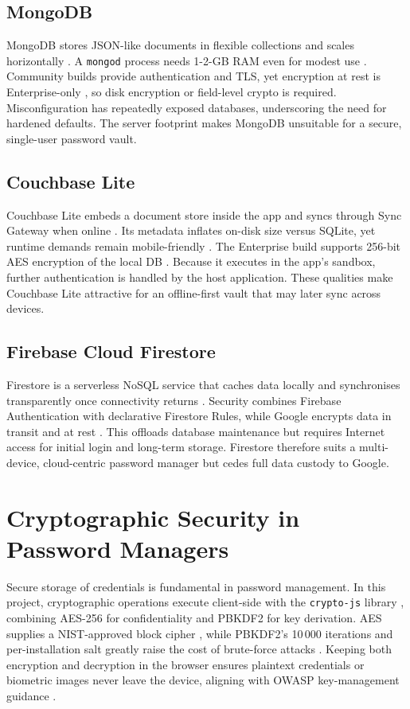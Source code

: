 \subsection*{MongoDB}
MongoDB stores JSON-like documents in flexible collections and scales
horizontally \autocite{Miryala2024}.  A \texttt{mongod} process needs 1-2-GB
RAM even for modest use \autocite{Dahunsi2021}.  Community builds provide
authentication and TLS, yet encryption at rest is Enterprise-only
\autocite{PrismaMongoEnc, MongoDB2025}, so disk encryption or field-level
crypto is required.  Misconfiguration has repeatedly exposed databases,
underscoring the need for hardened defaults.  The
server footprint makes MongoDB unsuitable for a secure, single-user password vault.

\subsection*{Couchbase Lite}
Couchbase Lite embeds a document store inside the app and syncs through
Sync Gateway when online \autocite{Pal2016}.  Its metadata inflates on-disk
size versus SQLite, yet runtime demands remain mobile-friendly
\autocite{Gkamas2022}.  The Enterprise build supports 256-bit AES encryption
of the local DB \autocite{CouchbaseEncryption, CouchbaseDoc2025}.  Because it
executes in the app's sandbox, further authentication is handled by the host
application.  These qualities make Couchbase Lite attractive for an
offline-first vault that may later sync across devices.

\subsection*{Firebase Cloud Firestore}
Firestore is a serverless NoSQL service that caches data locally and
synchronises transparently once connectivity returns \autocite{FirebaseDoc2025}.
Security combines Firebase Authentication with declarative Firestore Rules,
while Google encrypts data in transit and at rest \autocite{FirebaseSecurity2025}.
This offloads database maintenance but requires Internet access for initial
login and long-term storage.  Firestore therefore suits a multi-device,
cloud-centric password manager but {\selectfont cedes full data custody to Google}.

\clearpage

\section{Cryptographic Security in Password Managers}
Secure storage of credentials is fundamental in password management.  
In this project, cryptographic operations execute client-side with the
\texttt{crypto-js} library \autocite{CryptoJS2024}, combining AES-256 for
confidentiality and PBKDF2 for key derivation.  AES supplies a
NIST-approved block cipher \autocite{NISTFIPS197}, while PBKDF2's 10\,000
iterations and per-installation salt greatly raise the cost of brute-force
attacks \autocite{RFC8018}.  Keeping both encryption and decryption in the
browser ensures plaintext credentials or biometric images never leave the
device, aligning with OWASP key-management guidance
\textcite{OWASPKeyMgmt2025}.

